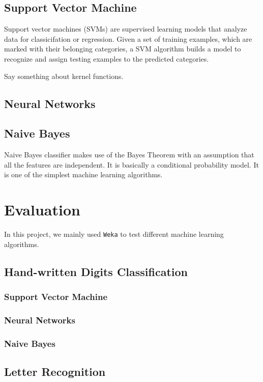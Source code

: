 \documentclass[11pt]{article}
\begin{document}
\subsection{Support Vector Machine}
Support vector machines (SVMs)\cite{cortes1995support} are supervised learning models that analyze data for classicifation or regression. Given a set of training examples, which are marked with their belonging categories, a SVM algorithm builds a model to recognize and assign testing examples to the predicted categories. 

Say something about kernel functions.

\subsection{Neural Networks}

\subsection{Naive Bayes}
Naive Bayes classifier makes use of the Bayes Theorem with an assumption that all the features are independent. It is basically a conditional probability model. It is one of the simplest machine learning algorithms.

\section{Evaluation}
In this project, we mainly used \texttt{Weka} \cite{hall2009weka} to test different machine learning algorithms.

\subsection{Hand-written Digits Classification}
\subsubsection{Support Vector Machine}

\subsubsection{Neural Networks}

\subsubsection{Naive Bayes}

\subsection{Letter Recognition}
\end{document}
